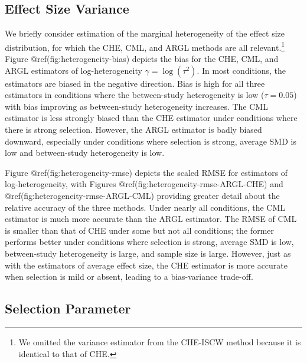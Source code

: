 \documentclass[
]{article}
\begin{document}
\subsection{Effect Size Variance}\label{effect-size-variance}

We briefly consider estimation of the marginal heterogeneity of the
effect size distribution, for which the CHE, CML, and ARGL methods are
all relevant.\footnote{We omitted the variance estimator from the
  CHE-ISCW method because it is identical to that of CHE.} Figure
@ref(fig:heterogeneity-bias) depicts the bias for the CHE, CML, and ARGL
estimators of log-heterogeneity \(\gamma = \log(\tau^2)\). In most
conditions, the estimators are biased in the negative direction. Bias is
high for all three estimators in conditions where the between-study
heterogeneity is low (\(\tau = 0.05\)) with bias improving as
between-study heterogeneity increases. The CML estimator is less
strongly biased than the CHE estimator under conditions where there is
strong selection. However, the ARGL estimator is badly biased downward,
especially under conditions where selection is strong, average SMD is
low and between-study heterogeneity is low.

Figure @ref(fig:heterogeneity-rmse) depicts the scaled RMSE for
estimators of log-heterogeneity, with Figures
@ref(fig:heterogeneity-rmse-ARGL-CHE) and
@ref(fig:heterogeneity-rmse-ARGL-CML) providing greater detail about the
relative accuracy of the three methods. Under nearly all conditions, the
CML estimator is much more accurate than the ARGL estimator. The RMSE of
CML is smaller than that of CHE under some but not all conditions; the
former performs better under conditions where selection is strong,
average SMD is low, between-study heterogeneity is large, and sample
size is large. However, just as with the estimators of average effect
size, the CHE estimator is more accurate when selection is mild or
absent, leading to a bias-variance trade-off.

\subsection{Selection Parameter}\label{selection-parameter}
\end{document}
